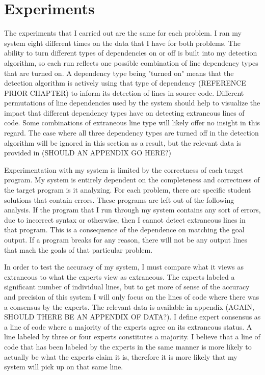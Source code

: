 {\color{red} }

\section{Experiments}
The experiments that I carried out are the same for each problem. I ran my system eight different times on the data that I have for both problems. The ability to turn different types of dependencies on or off is built into my detection algorithm, so each run reflects one possible combination of line dependency types that are turned on. A dependency type being "turned on" means that the detection algorithm is actively using that type of dependency {\color{red}(REFERENCE PRIOR CHAPTER)} to inform its detection of lines in source code. Different permutations of line dependencies used by the system should help to visualize the impact that different dependency types have on detecting extraneous lines of code. Some combinations of extraneous line type will likely offer no insight in this regard. The case where all three dependency types are turned off in the detection algorithm will be ignored in this section as a result, but the relevant data is provided in {\color{red} (SHOULD AN APPENDIX GO HERE?)}



Experimentation with my system is limited by the correctness of each target program. My system is entirely dependent on the completeness and correctness of the target program is it analyzing. For each problem, there are specific student solutions that contain errors. These programs are left out of the following analysis. If the program that I run through my system contains any sort of errors, due to incorrect syntax or otherwise, then I cannot detect extraneous lines in that program. This is a consequence of the dependence on matching the goal output. If a program breaks for any reason, there will not be any output lines that mach the goals of that particular problem. 

In order to test the accuracy of my system, I must compare what it views as extraneous to what the experts view as extraneous. The experts labeled a significant number of individual lines, but to get more of sense of the accuracy and precision of this system I will only focus on the lines of code where there was a consensus by the experts. The relevant data is available in appendix {\color{red}(AGAIN, SHOULD THERE BE AN APPENDIX OF DATA?)}. I define expert consensus as a line of code where a majority of the experts agree on its extraneous status. A line labeled by three or four experts constitutes a majority. I believe that a line of code that has been labeled by the experts in the same manner is more likely to actually be what the experts claim it is, therefore it is more likely that my system will pick up on that same line. 


